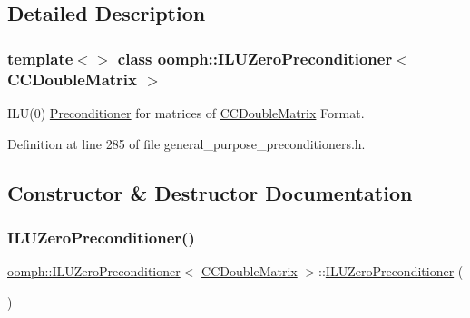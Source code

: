 \subsection{Detailed Description}
\subsubsection*{template$<$$>$\newline
class oomph\+::\+I\+L\+U\+Zero\+Preconditioner$<$ C\+C\+Double\+Matrix $>$}

I\+L\+U(0) \hyperlink{classoomph_1_1Preconditioner}{Preconditioner} for matrices of \hyperlink{classoomph_1_1CCDoubleMatrix}{C\+C\+Double\+Matrix} Format. 

Definition at line 285 of file general\+\_\+purpose\+\_\+preconditioners.\+h.



\subsection{Constructor \& Destructor Documentation}
\mbox{\label{classoomph_1_1ILUZeroPreconditioner_3_01CCDoubleMatrix_01_4_afe9c5666258b17786708bd9d8932ca07}} 
\subsubsection{\texorpdfstring{I\+L\+U\+Zero\+Preconditioner()}{ILUZeroPreconditioner()}\hspace{0.1cm}{\footnotesize\ttfamily [1/2]}}
{\footnotesize\ttfamily \hyperlink{classoomph_1_1ILUZeroPreconditioner}{oomph\+::\+I\+L\+U\+Zero\+Preconditioner}$<$ \hyperlink{classoomph_1_1CCDoubleMatrix}{C\+C\+Double\+Matrix} $>$\+::\hyperlink{classoomph_1_1ILUZeroPreconditioner}{I\+L\+U\+Zero\+Preconditioner} (\begin{DoxyParamCaption}{ }\end{DoxyParamCaption})\hspace{0.3cm}{\ttfamily [inline]}}



